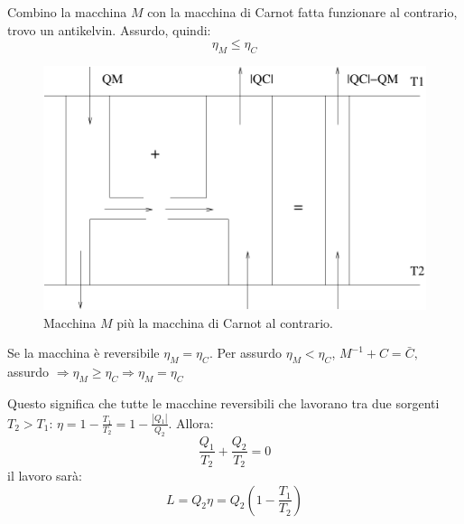 Combino la macchina $M$ con la macchina di Carnot fatta funzionare al contrario, trovo un antikelvin. Assurdo, quindi: \[\eta_M\leq\eta_C\]
\begin{figure}[htbp]
\centering
\includegraphics[scale=0.5]{immagini/fisica1/M+c-1}
\caption{Macchina $M$ più la macchina di Carnot al contrario.}
\end{figure}

\begin{Cor}
Se la macchina è reversibile $\eta_M=\eta_C$. Per assurdo $\eta_M<\eta_C$, $M^{-1}+C=\bar{C},$ assurdo $\Rightarrow \eta_M\geq\eta_C\Rightarrow \eta_M=\eta_C$
\end{Cor}

Questo significa che tutte le macchine reversibili che lavorano tra due sorgenti $T_2 > T_1$: $\eta = 1-\frac{T_1}{T_2} = 1 - \frac{|Q_1|}{Q_2}$. Allora:
\begin{equation}
 \frac{Q_1}{T_2} + \frac{Q_2}{T_2} = 0
\end{equation}
il lavoro sarà:
\begin{equation}
 L = Q_2\eta = Q_2 \left(1 - \frac{T_1}{T_2}\right)
\end{equation}





